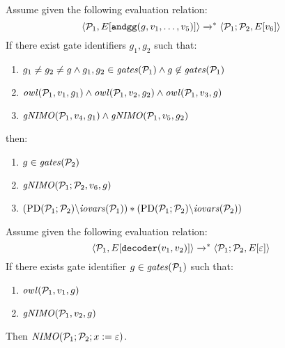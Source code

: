 \begin{lemma}
Assume given the following evaluation relation:
$$
\langle \mathcal{P}_1,E[\texttt{andgg}(g,v_1,\ldots,v_5)] \rangle \xrightarrow{}^{*} \langle \mathcal{P}_1;\mathcal{P}_2,E[v_6] \rangle
$$
If there exist gate identifiers $g_1, g_2$ such that:
\begin{enumerate}
  \item $g_1 \ne g_2 \ne g \wedge g_1,g_2 \in \mathit{gates}(\mathcal{P}_1) \wedge g \not\in \mathit{gates}(\mathcal{P}_1)$
  \item $\mathit{owl}(\mathcal{P}_1,v_1,g_1) \wedge \mathit{owl}(\mathcal{P}_1,v_2,g_2) \wedge \mathit{owl}(\mathcal{P}_1,v_3,g)$
  \item $\mathit{gNIMO}(\mathcal{P}_1,v_4,g_1) \wedge \mathit{gNIMO}(\mathcal{P}_1,v_5,g_2)$
\end{enumerate}
then:
\begin{enumerate}
  \item $g \in \mathit{gates}(\mathcal{P}_2)$
  \item $\mathit{gNIMO}(\mathcal{P}_1;\mathcal{P}_2,v_6,g)$
  \item $(\mathrm{PD}(\mathcal{P}_1;\mathcal{P}_2)\backslash\mathit{iovars}(\mathcal{P}_1)) * (\mathrm{PD}(\mathcal{P}_1;\mathcal{P}_2)\backslash\mathit{iovars}(\mathcal{P}_2))$
\end{enumerate}
\end{lemma}

\begin{lemma}[Decoding]
Assume given the following evaluation relation:
$$
\langle \mathcal{P}_1,E[\texttt{decoder}(v_1,v_2)] \rangle \xrightarrow{}^{*} \langle \mathcal{P}_1;\mathcal{P}_2,E[\varepsilon] \rangle
$$
If there exists gate identifier $g \in \mathit{gates}(\mathcal{P}_1)$ such that:
\begin{enumerate}
  \item $\mathit{owl}(\mathcal{P}_1,v_1,g)$
  \item $\mathit{gNIMO}(\mathcal{P}_1,v_2,g)$
\end{enumerate}
Then $\mathit{NIMO}(\mathcal{P}_1;\mathcal{P}_2;x := \varepsilon)$.
\end{lemma}

